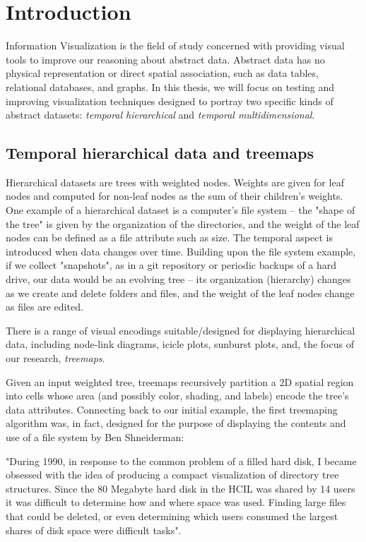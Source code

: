 \chapter{Introduction}

Information Visualization is the field of study concerned with providing visual tools to improve our reasoning about abstract data. Abstract data has no physical representation or direct spatial association, such as data tables, relational databases, and graphs.
In this thesis, we will focus on testing and improving visualization techniques designed to portray two specific kinds of abstract datasets: \emph{temporal hierarchical} and \emph{temporal multidimensional}.


\section{Temporal hierarchical data and treemaps}

Hierarchical datasets are trees with weighted nodes. Weights are given for leaf nodes and computed for non-leaf nodes as the sum of their children's weights. One example of a hierarchical dataset is a computer's file system -- the "shape of the tree" is given by the organization of the directories, and the weight of the leaf nodes can be defined as a file attribute such as size.
The temporal aspect is introduced when data changes over time. Building upon the file system example, if we collect "snapshots", as in a git repository or periodic backups of a hard drive, our data would be an evolving tree -- its organization (hierarchy) changes as we create and delete folders and files, and the weight of the leaf nodes change as files are edited.

There is a range of visual encodings suitable/designed for displaying hierarchical data, including node-link diagrams, icicle plots, sunburst plots, and, the focus of our research, \emph{treemaps}.

Given an input weighted tree, treemaps recursively partition a 2D spatial region into cells whose area (and possibly color, shading, and labels) encode the tree's data attributes. 
Connecting back to our initial example, the first treemaping algorithm was, in fact, designed for the purpose of displaying the contents and use of a file system by Ben Shneiderman:

\begin{quoting}
    "During 1990, in response to the common problem of a filled hard disk, I became obsessed with the idea of producing a compact visualization of directory tree structures. Since the 80 Megabyte hard disk in the HCIL was shared by 14 users it was difficult to determine how and where space was used. Finding large files that could be deleted, or even determining which users consumed the largest shares of disk space were difficult tasks".
\end{quoting}

